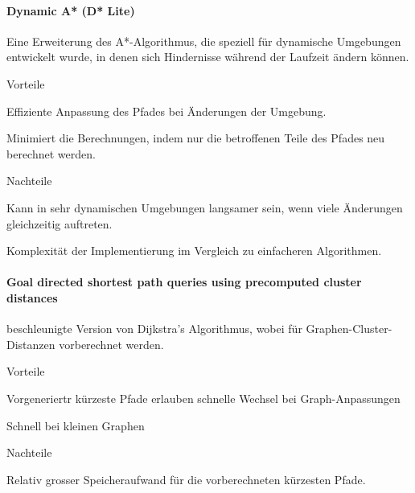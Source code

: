 \documentclass[../main.tex]{subfiles}
\begin{document}
\paragraph{Dynamic A* (D* Lite)}

Eine Erweiterung des A*-Algorithmus, die speziell für dynamische Umgebungen entwickelt wurde, in denen sich Hindernisse während der Laufzeit ändern können.

\begin{minipage}[t]{0.48\textwidth}
\begin{items}
  \item [Vorteile]
  \item Effiziente Anpassung des Pfades bei Änderungen der Umgebung.
  \item Minimiert die Berechnungen, indem nur die betroffenen Teile des Pfades neu berechnet werden.
\end{items}
\end{minipage}
\hfill
\begin{minipage}[t]{0.48\textwidth}
\begin{items}
  \item [Nachteile]
  \item Kann in sehr dynamischen Umgebungen langsamer sein, wenn viele Änderungen gleichzeitig auftreten.
  \item Komplexität der Implementierung im Vergleich zu einfacheren Algorithmen.
\end{items}
\end{minipage}


\paragraph{Goal directed shortest path queries using precomputed cluster distances}
beschleunigte Version von Dijkstra's Algorithmus, wobei für Graphen-Cluster-Distanzen vorberechnet werden.

\begin{minipage}[t]{0.48\textwidth}
\begin{items}
  \item [Vorteile]
  \item Vorgeneriertr kürzeste Pfade erlauben schnelle Wechsel bei Graph-Anpassungen
  \item Schnell bei kleinen Graphen
\end{items}
\end{minipage}
\hfill
\begin{minipage}[t]{0.48\textwidth}
\begin{items}
  \item [Nachteile]
  \item Relativ grosser Speicheraufwand für die vorberechneten kürzesten Pfade.
\end{items}
\end{minipage}
\end{document}
